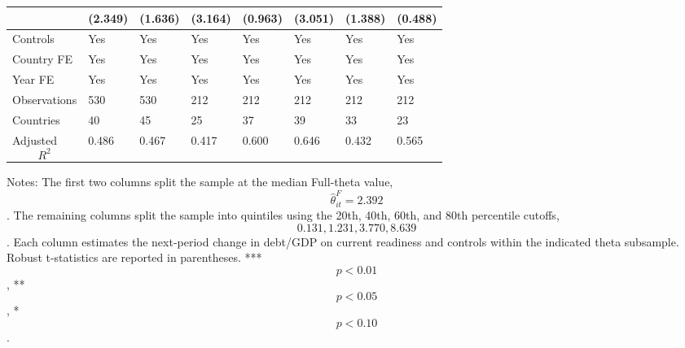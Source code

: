 \begin{table}[H]
\begin{threeparttable}
\begin{tabularx}{\textwidth}{lYYYYYYY}
  & (2.349) & (1.636) & (3.164) & (0.963) & (3.051) & (1.388) & (0.488) \\
\midrule
Controls & Yes & Yes & Yes & Yes & Yes & Yes & Yes \\
Country FE & Yes & Yes & Yes & Yes & Yes & Yes & Yes \\
Year FE & Yes & Yes & Yes & Yes & Yes & Yes & Yes \\
Observations & 530 & 530 & 212 & 212 & 212 & 212 & 212 \\
Countries & 40 & 45 & 25 & 37 & 39 & 33 & 23 \\
Adjusted $$R^2$$ & 0.486 & 0.467 & 0.417 & 0.600 & 0.646 & 0.432 & 0.565 \\
\bottomrule
\end{tabularx}
\begin{tablenotes}[flushleft]\footnotesize
\item Notes: The first two columns split the sample at the median Full-theta value, $$\widehat{\theta}^{F}_{it}=2.392$$. The remaining columns split the sample into quintiles using the 20th, 40th, 60th, and 80th percentile cutoffs, $$0.131, 1.231, 3.770, 8.639$$. Each column estimates the next-period change in debt/GDP on current readiness and controls within the indicated theta subsample. Robust t-statistics are reported in parentheses. *** $$p<0.01$$, ** $$p<0.05$$, * $$p<0.10$$.
\end{tablenotes}
\end{threeparttable}
\end{table}
